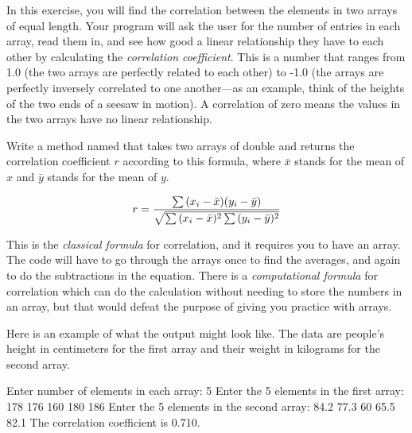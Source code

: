 \begin{exercise}
In this exercise, you will find the correlation between the elements in two arrays of equal length.
Your program will ask the user for the number of entries in each array, read them in, and see how good a linear relationship they have to each other by calculating the {\em correlation coefficient}. This is a number that ranges from 1.0 (the two arrays are perfectly related to each other) to -1.0 (the arrays are perfectly inversely correlated to one another---as an example, think of the heights of the two ends of a seesaw in motion). A correlation of zero means the values in the two arrays have no linear relationship.

Write a method named  that takes two arrays of double and returns the correlation coefficient $r$ according to this formula, where $\bar x$ stands for the mean of $x$ and $\bar y$ stands for the mean of $y$.

\begin{equation*}
r = {{ \sum{( x_i - \bar x) (y_i - \bar y)}} \over {\sqrt { \sum{(x_i - \bar x)^2 \sum{(y_i -\bar y)^2} }}}}
\end{equation*}

This is the {\em classical formula} for correlation, and it requires you to have an array. The code will have to go through the arrays once to find the averages, and again to do the subtractions in the equation. There is a {\em computational formula} for correlation which can do the calculation without needing to store the numbers in an array, but that would defeat the purpose of giving you practice with arrays.

Here is an example of what the output might look like. The data are people's height in centimeters for the first array and their weight in kilograms for the second array.

\begin{stdout}
Enter number of elements in each array: 5
Enter the 5 elements in the first array: 178 176 160 180 186
Enter the 5 elements in the second array: 84.2 77.3 60 65.5 82.1
The correlation coefficient is 0.710.
\end{stdout}

\end{exercise}

